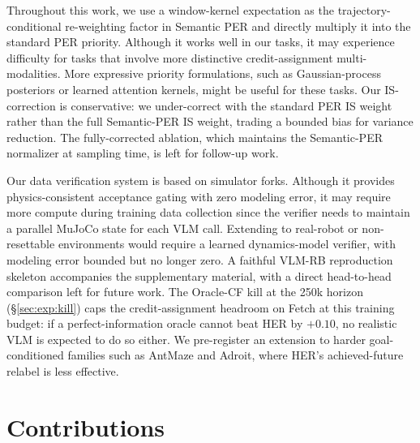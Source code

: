 \documentclass{article}
\begin{document}
Throughout this work, we use a window-kernel expectation as the
trajectory-conditional re-weighting factor in Semantic PER and
directly multiply it into the standard PER priority. Although it
works well in our tasks, it may experience difficulty for tasks
that involve more distinctive credit-assignment multi-modalities.
More expressive priority formulations, such as Gaussian-process
posteriors or learned attention kernels, might be useful for these
tasks. Our IS-correction is conservative: we under-correct with
the standard PER IS weight rather than the full Semantic-PER IS
weight, trading a bounded bias for variance reduction. The
fully-corrected ablation, which maintains the Semantic-PER
normalizer at sampling time, is left for follow-up work.

Our data verification system is based on simulator forks. Although
it provides physics-consistent acceptance gating with zero
modeling error, it may require more compute during training data
collection since the verifier needs to maintain a parallel MuJoCo
state for each VLM call. Extending to real-robot or non-resettable
environments would require a learned dynamics-model verifier, with
modeling error bounded but no longer zero. A faithful VLM-RB
\citep{sharony2026vlmrb} reproduction skeleton accompanies the
supplementary material, with a direct head-to-head comparison left
for future work. The Oracle-CF kill at the 250k horizon
(\S\ref{sec:exp:kill}) caps the credit-assignment headroom on
Fetch at this training budget: if a perfect-information oracle
cannot beat HER by $+0.10$, no realistic VLM is expected to do so
either. We pre-register an extension to harder goal-conditioned
families such as AntMaze and Adroit, where HER's achieved-future
relabel is less effective.

\section*{Contributions}
\label{sec:contributions}
\end{document}
